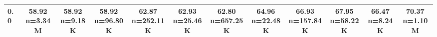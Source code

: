 \begin{table}
\begin{tabular}{lccccccccccc}
0.0 & \makecell{58.92 \\ \scriptsize n=3.34M} & \makecell{58.92 \\ \scriptsize n=9.18K} & \makecell{58.92 \\ \scriptsize n=96.80K} & \makecell{62.87 \\ \scriptsize n=252.11K} & \makecell{62.93 \\ \scriptsize n=25.46K} & \makecell{62.80 \\ \scriptsize n=657.25K} & \makecell{64.96 \\ \scriptsize n=22.48K} & \makecell{66.93 \\ \scriptsize n=157.84K} & \makecell{67.95 \\ \scriptsize n=58.22K} & \makecell{66.47 \\ \scriptsize n=8.24K} & \makecell{70.37 \\ \scriptsize n=1.10M} \\
            \bottomrule
            \end{tabular}
            \label{tab:si-disruption-matrix-2}
            \end{table}